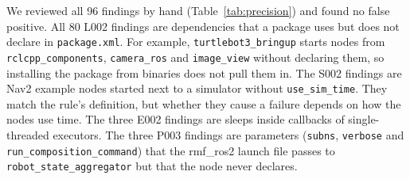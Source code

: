 \documentclass[conference]{IEEEtran}
\newcommand{\code}[1]{\texttt{#1}}
\begin{document}
\begin{table}[t]
\centering
\caption{Current implementation: one thread, median of three runs}
\label{tab:current}
\footnotesize
{}
\end{table}

We reviewed all 96 findings by hand (Table~\ref{tab:precision}) and found no false positive. All 80 L002 findings are
dependencies that a package uses but does not declare in \code{package.xml}. For example,
\code{turtlebot3\_bringup} starts nodes from \code{rclcpp\_components}, \code{camera\_ros} and
\code{image\_view} without declaring them, so installing the package from binaries does not pull
them in. The S002 findings are Nav2 example nodes started next to a simulator without
\code{use\_sim\_time}. They match the rule's definition, but whether they cause a failure depends
on how the nodes use time. The three E002 findings are sleeps inside callbacks of
single-threaded executors. The three P003 findings are parameters (\code{subns}, \code{verbose}
and \code{run\_composition\_command}) that the rmf\_ros2 launch file passes to
\code{robot\_state\_aggregator} but that the node never declares.
\end{document}
